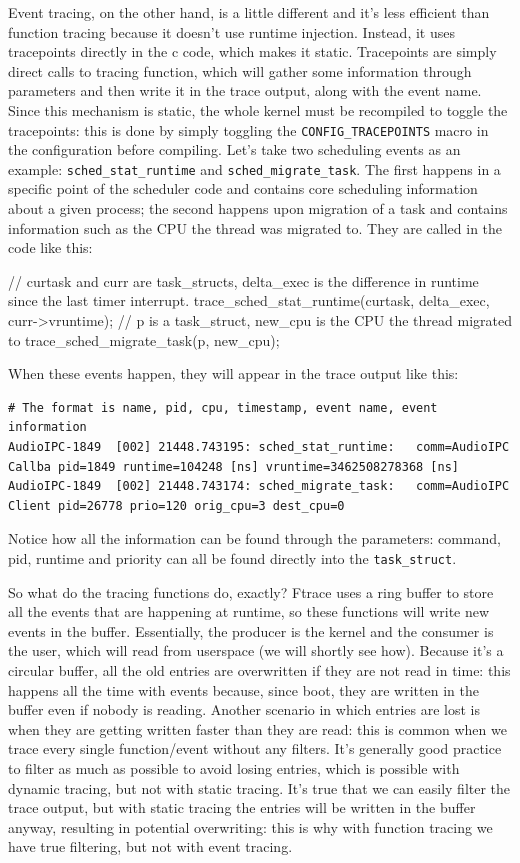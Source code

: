 \documentclass[10pt]{book}
\begin{document}
Event tracing, on the other hand, is a little different and it's less efficient than function tracing because it doesn't use runtime injection. Instead, it uses tracepoints directly in the c code, which makes it static. Tracepoints are simply direct calls to tracing function, which will gather some information through parameters and then write it in the trace output, along with the event name. Since this mechanism is static, the whole kernel must be recompiled to toggle the tracepoints: this is done by simply toggling the \verb|CONFIG_TRACEPOINTS| macro in the configuration before compiling. Let's take two scheduling events as an example: \verb|sched_stat_runtime| and \verb|sched_migrate_task|. The first happens in a specific point of the scheduler code and contains core scheduling information about a given process; the second happens upon migration of a task and contains information such as the CPU the thread was migrated to. They are called in the code like this:
\begin{code}
// curtask and curr are task_structs, delta_exec is the difference in runtime since the last timer interrupt. 
trace_sched_stat_runtime(curtask, delta_exec, curr->vruntime);
// p is a task_struct, new_cpu is the CPU the thread migrated to
trace_sched_migrate_task(p, new_cpu);
\end{code}
When these events happen, they will appear in the trace output like this:
\begin{verbatim}
# The format is name, pid, cpu, timestamp, event name, event information 
AudioIPC-1849  [002] 21448.743195: sched_stat_runtime:   comm=AudioIPC Callba pid=1849 runtime=104248 [ns] vruntime=3462508278368 [ns]
AudioIPC-1849  [002] 21448.743174: sched_migrate_task:   comm=AudioIPC Client pid=26778 prio=120 orig_cpu=3 dest_cpu=0
\end{verbatim} %
Notice how all the information can be found through the parameters: command, pid, runtime and priority can all be found directly into the \verb|task_struct|.

So what do the tracing functions do, exactly? Ftrace uses a ring buffer to store all the events that are happening at runtime, so these functions will write new events in the buffer. Essentially, the producer is the kernel and the consumer is the user, which will read from userspace (we will shortly see how). Because it's a circular buffer, all the old entries are overwritten if they are not read in time: this happens all the time with events because, since boot, they are written in the buffer even if nobody is reading. Another scenario in which entries are lost is when they are getting written faster than they are read: this is common when we trace every single function/event without any filters. It's generally good practice to filter as much as possible to avoid losing entries, which is possible with dynamic tracing, but not with static tracing. It's true that we can easily filter the trace output, but with static tracing the entries will be written in the buffer anyway, resulting in potential overwriting: this is why with function tracing we have true filtering, but not with event tracing.
\end{document}
